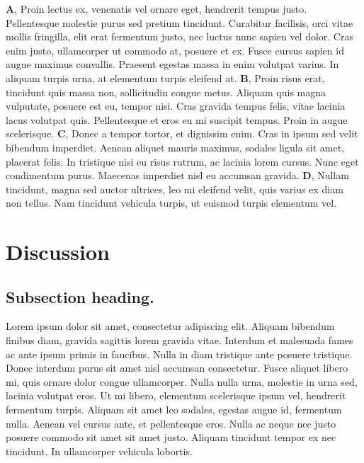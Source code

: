 \documentclass[10pt,letterpaper]{article}
\begin{document}
\begin{adjustwidth}{-2in}{0in}
\textbf{A}, Proin lectus ex, venenatis vel ornare eget, hendrerit tempus justo. Pellentesque molestie purus sed pretium tincidunt. Curabitur facilisis, orci vitae mollis fringilla, elit erat fermentum justo, nec luctus nunc sapien vel dolor. Cras enim justo, ullamcorper ut commodo at, posuere et ex. Fusce cursus sapien id augue maximus convallis. Praesent egestas massa in enim volutpat varius. In aliquam turpis urna, at elementum turpis eleifend at. \textbf{B}, Proin risus erat, tincidunt quis massa non, sollicitudin congue metus. Aliquam quis magna vulputate, posuere est eu, tempor nisi. Cras gravida tempus felis, vitae lacinia lacus volutpat quis. Pellentesque et eros eu mi suscipit tempus. Proin in augue scelerisque. \textbf{C}, Donec a tempor tortor, et dignissim enim. Cras in ipsum sed velit bibendum imperdiet. Aenean aliquet mauris maximus, sodales ligula sit amet, placerat felis. In tristique nisi eu risus rutrum, ac lacinia lorem cursus. Nunc eget condimentum purus. Maecenas imperdiet nisl eu accumsan gravida. \textbf{D}, Nullam tincidunt, magna sed auctor ultrices, leo mi eleifend velit, quis varius ex diam non tellus. Nam tincidunt vehicula turpis, ut euismod turpis elementum vel.
\end{adjustwidth}



\section*{Discussion}
\subsection*{Subsection heading.}

Lorem ipsum dolor sit amet, consectetur adipiscing elit. Aliquam bibendum finibus diam, gravida sagittis lorem gravida vitae. Interdum et malesuada fames ac ante ipsum primis in faucibus. Nulla in diam tristique ante posuere tristique. Donec interdum purus sit amet nisl accumsan consectetur. Fusce aliquet libero mi, quis ornare dolor congue ullamcorper. Nulla nulla urna, molestie in urna sed, lacinia volutpat eros. Ut mi libero, elementum scelerisque ipsum vel, hendrerit fermentum turpis. Aliquam sit amet leo sodales, egestas augue id, fermentum nulla. Aenean vel cursus ante, et pellentesque eros. Nulla ac neque nec justo posuere commodo sit amet sit amet justo. Aliquam tincidunt tempor ex nec tincidunt. In ullamcorper vehicula lobortis. 
\end{document}
